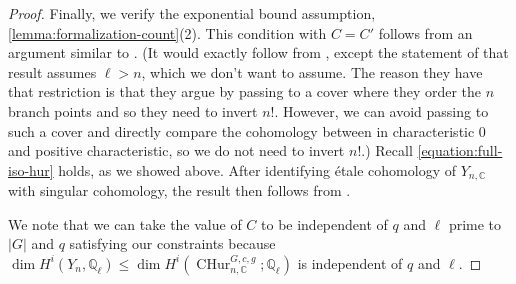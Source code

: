 \documentclass[12 pt]{amsart}
\theoremstyle{plain}
\theoremstyle{definition}
\theoremstyle{remark}
\numberwithin{equation}{section}
\newcommand{\boundarycphur}[5]{\operatorname{CHur}^{#1, #3, #5}_{#2, #4}}
\begin{document}
\begin{proof}
	
	Finally, we verify the exponential bound assumption,
	\autoref{lemma:formalization-count}(2).
	This condition with $C = C'$
	follows from an argument similar to \cite[Proposition
	7.8]{EllenbergVW:cohenLenstra}.
	(It would exactly follow from \cite[Proposition
		7.8]{EllenbergVW:cohenLenstra}, except the statement of that
	result assumes $\ell > n$, which we don't want to assume. The reason
they have that restriction is that they argue by passing to a cover where they
order the $n$ branch points and so they need to invert $n!$. 
However, we can avoid passing to such a cover and directly compare the
cohomology between in characteristic $0$ and positive characteristic, so we do not need to invert $n!$.)
	Recall
	\eqref{equation:full-iso-hur} holds,
	as we showed above.
After identifying \'etale cohomology of $Y_{n, \mathbb C}$ with singular cohomology,
the result then follows from \cite[Proposition 2.5]{EllenbergVW:cohenLenstra}.

	We note that we can take the value of $C$ to be independent of $q$ and
	$\ell$ prime to $|G|$ and $q$
	satisfying our constraints because $\dim H^i(Y_n, \mathbb Q_\ell) \leq  \dim H^i(\boundarycphur G n c
	{\mathbb C}g; \mathbb Q_\ell)$ is independent of $q$ and $\ell$.
\end{proof}
\end{document}
